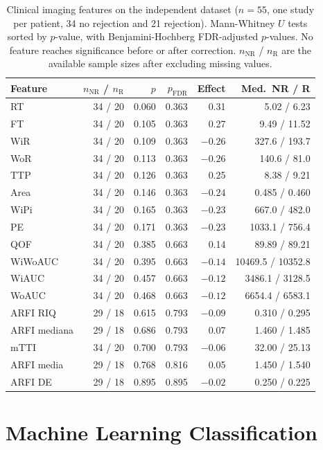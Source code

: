 \begin{table}[ht]
\centering
\caption{Clinical imaging features on the independent dataset ($n = 55$, one study per patient, 34 no rejection and 21 rejection). Mann-Whitney $U$ tests sorted by $p$-value, with Benjamini-Hochberg FDR-adjusted $p$-values. No feature reaches significance before or after correction. $n_{\text{NR}}$ / $n_{\text{R}}$ are the available sample sizes after excluding missing values.}
\label{tab:clinical_independent}
\small
\begin{tabular}{lrrrrr}
\toprule
Feature & $n_{\text{NR}}$ / $n_{\text{R}}$ & $p$ & $p_{\text{FDR}}$ & Effect & Med.\ NR / R \\
\midrule
RT & 34 / 20 & 0.060 & 0.363 & 0.31 & 5.02 / 6.23 \\
FT & 34 / 20 & 0.105 & 0.363 & 0.27 & 9.49 / 11.52 \\
WiR & 34 / 20 & 0.109 & 0.363 & $-0.26$ & 327.6 / 193.7 \\
WoR & 34 / 20 & 0.113 & 0.363 & $-0.26$ & 140.6 / 81.0 \\
TTP & 34 / 20 & 0.126 & 0.363 & 0.25 & 8.38 / 9.21 \\
Area & 34 / 20 & 0.146 & 0.363 & $-0.24$ & 0.485 / 0.460 \\
WiPi & 34 / 20 & 0.165 & 0.363 & $-0.23$ & 667.0 / 482.0 \\
PE & 34 / 20 & 0.171 & 0.363 & $-0.23$ & 1033.1 / 756.4 \\
QOF & 34 / 20 & 0.385 & 0.663 & 0.14 & 89.89 / 89.21 \\
WiWoAUC & 34 / 20 & 0.395 & 0.663 & $-0.14$ & 10469.5 / 10352.8 \\
WiAUC & 34 / 20 & 0.457 & 0.663 & $-0.12$ & 3486.1 / 3128.5 \\
WoAUC & 34 / 20 & 0.468 & 0.663 & $-0.12$ & 6654.4 / 6583.1 \\
ARFI RIQ & 29 / 18 & 0.615 & 0.793 & $-0.09$ & 0.310 / 0.295 \\
ARFI mediana & 29 / 18 & 0.686 & 0.793 & 0.07 & 1.460 / 1.485 \\
mTTI & 34 / 20 & 0.700 & 0.793 & $-0.06$ & 32.00 / 25.13 \\
ARFI media & 29 / 18 & 0.768 & 0.816 & 0.05 & 1.450 / 1.540 \\
ARFI DE & 29 / 18 & 0.895 & 0.895 & $-0.02$ & 0.250 / 0.225 \\
\bottomrule
\end{tabular}
\end{table}


\section{Machine Learning Classification}
\label{sec:ml_results}

